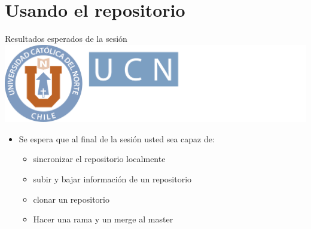 \documentclass[12pt,a4paper,usenames,x11names,compress]{beamer}
\begin{document}
\section{Usando el repositorio}

\begin{frame}{Resultados esperados de la sesión\hfill \includegraphics[scale=.1]{eciem.png}}
\begin{itemize}
\item Se espera que al final de la sesión usted sea capaz de:
\begin{itemize}
\justifying
\item sincronizar el repositorio localmente
\item subir y bajar información de un repositorio
\item clonar un repositorio 
\item Hacer una rama y un merge al master
\end{itemize} 
\end{itemize}
\end{frame}
%
%
\end{document}
